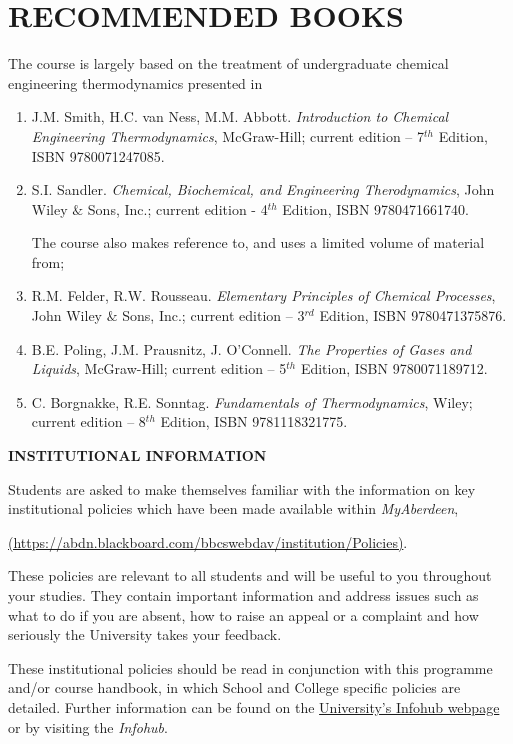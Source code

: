 \documentclass[12pts,a4paper,amsmath,amssymb,floatfix]{article}%
\begin{document}
\section{RECOMMENDED BOOKS}
The course is largely based on the treatment of undergraduate chemical engineering thermodynamics presented in
\begin{enumerate}[1.]
\item J.M. Smith, H.C. van Ness, M.M. Abbott. {\it Introduction to Chemical Engineering Thermodynamics}, McGraw-Hill; current edition – 7$^{th}$ Edition, ISBN 9780071247085.
\item  S.I. Sandler. {\it Chemical, Biochemical, and Engineering Therodynamics}, John Wiley $\&$ Sons, Inc.; current edition - 4$^{th}$ Edition, ISBN 9780471661740.
\medskip

The course also makes reference to, and uses a limited volume of material from;
\medskip

\item R.M. Felder, R.W. Rousseau. {\it Elementary Principles of Chemical Processes}, John Wiley $\&$ Sons, Inc.; current edition – 3$^{rd}$ Edition, ISBN 9780471375876.
\item B.E. Poling, J.M. Prausnitz, J. O’Connell. {\it The Properties of Gases and Liquids}, McGraw-Hill; current edition – 5$^{th}$ Edition, ISBN 9780071189712.
\item C. Borgnakke, R.E. Sonntag. {\it Fundamentals of Thermodynamics}, Wiley; current edition – 8$^{th}$ Edition, ISBN 9781118321775.
\end{enumerate}


\bigskip

{\large {\bf INSTITUTIONAL INFORMATION}}

Students are asked to make themselves familiar with the information on key institutional policies which have been made available within {\it MyAberdeen},
\begin{center}
\href{https://abdn.blackboard.com/bbcswebdav/institution/Policies}{(https://abdn.blackboard.com/bbcswebdav/institution/Policies)}.
\end{center}
These policies are relevant to all students and will be useful to you throughout your studies. They contain important information and address issues such as what to do if you are absent, how to raise an appeal or a complaint and how seriously the University takes your feedback. 
\medskip

These institutional policies should be read in conjunction with this programme and/or course handbook, in which School and College specific policies are detailed. Further information can be found on the \href{http:www.abdn.ac.uk/infohub/}{University's Infohub webpage} or by visiting the {\it Infohub}.
\end{document}
